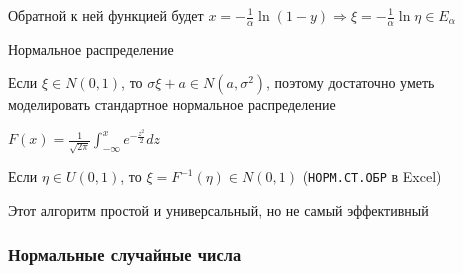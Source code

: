 \documentclass[12pt]{article}
\begin{document}
Обратной к ней функцией будет $x = -\frac{1}{\alpha} \ln (1 - y) \Longrightarrow \xi = -\frac{1}{\alpha} \ln \eta \in E_\alpha$

\Ex Нормальное распределение

Если $\xi \in N(0, 1)$, то $\sigma \xi + a \in N(a, \sigma^2)$, поэтому достаточно уметь моделировать стандартное нормальное распределение

$F(x) = \frac{1}{\sqrt{2\pi}} \int_{-\infty}^x e^{-\frac{z^2}{2}} dz$

Если $\eta \in U(0, 1)$, то $\xi = F^{-1}(\eta) \in N(0, 1)$ (\texttt{НОРМ.СТ.ОБР} в Excel)

\Nota Этот алгоритм простой и универсальный, но не самый эффективный

\subsubsection{Нормальные случайные числа}
\end{document}
